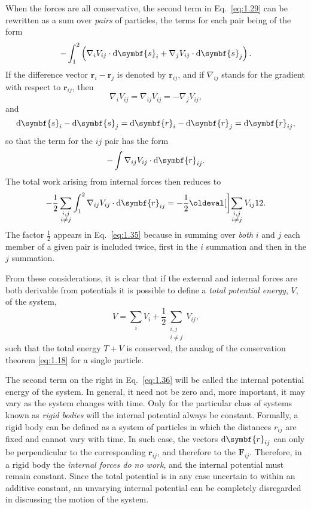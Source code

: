 When the forces are all conservative, the second term in Eq.~\eqref{eq:1.29} can be rewritten as a sum over \emph{pairs} of particles, the terms for each pair being of the form
\begin{equation*}
    -\int_1^2\left(\nabla_iV_{ij}\cdot\odif{\symbf{s}_{i}}+\nabla_jV_{ij}\cdot\odif{\symbf{s}_j}\right).
\end{equation*}
If the difference vector \(\symbf{r}_i-\symbf{r}_j\) is denoted by \(\symbf{r}_{ij}\), and if \(\nabla_{ij}\) stands for the gradient with respect to \(\symbf{r}_{ij}\), then
\begin{equation*}
    \nabla_iV_{ij}=\nabla_{ij}V_{ij}=-\nabla_jV_{ij},
\end{equation*}
and
\begin{equation*}
    \odif{\symbf{s}_i}-\odif{\symbf{s}_j}=\odif{\symbf{r}_i}-\odif{\symbf{r}_j}=\odif{\symbf{r}_{ij}},
\end{equation*}
so that the term for the \(ij\) pair has the form
\begin{equation*}
    -\int\nabla_{ij}V_{ij}\cdot\odif{\symbf{r}_{ij}}.
\end{equation*}
The total work arising from internal forces then reduces to
\begin{equation}
    -\frac{1}{2}\sum_{\substack{i,j\\i\ne j}}\int_1^2\nabla_{ij}V_{ij}\cdot\odif{\symbf{r}_{ij}}=-\frac{1}{2}\eval[\bigg]{\sum_{\substack{i,j\\i\ne j}}V_{ij}}[1][2].\label{eq:1.35}
\end{equation}
The factor \(\frac{1}{2}\) appears in Eq.~\eqref{eq:1.35} because in summing over \emph{both} \(i\) and \(j\) each member of a given pair is included twice, first in the \(i\) summation and then in the \(j\) summation.

From these considerations, it is clear that if the external and internal forces are both derivable from potentials it is possible to define a \emph{total potential energy}, \(V\), of the system,
\begin{equation}
    V=\sum_iV_i+\frac{1}{2}\sum_{\substack{i,j\\i\ne j}}V_{ij},\label{eq:1.36}
\end{equation}
such that the total energy \(T+V\) is conserved, the analog of the conservation theorem \eqref{eq:1.18} for a single particle.

The second term on the right in Eq.~\eqref{eq:1.36} will be called the internal potential energy of the system. In general, it need not be zero and, more important, it may vary as the system changes with time. Only for the particular class of systems known as \emph{rigid bodies} will the internal potential always be constant. Formally, a rigid body can be defined as a system of particles in which the distances \(r_{ij}\) are fixed and cannot vary with time. In such case, the vectors \(\odif{\symbf{r}_{ij}}\) can only be perpendicular to the corresponding \(\symbf{r}_{ij}\), and therefore to the \(\symbf{F}_{ij}\). Therefore, in a rigid body the \emph{internal forces do no work}, and the internal potential must remain constant. Since the total potential is in any case uncertain to within an additive constant, an unvarying internal potential can be completely disregarded in discussing the motion of the system.
